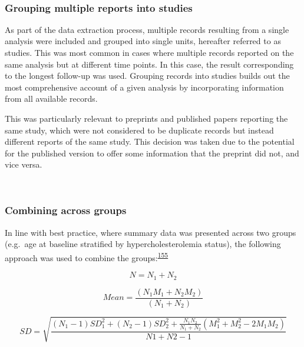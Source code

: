 \documentclass[a4paper, twoside]{templates/ociamthesis}
\begin{document}
~

\hypertarget{grouping-multiple-reports-into-studies}{%
\subsubsection{Grouping multiple reports into studies}\label{grouping-multiple-reports-into-studies}}

As part of the data extraction process, multiple records resulting from a single analysis were included and grouped into single units, hereafter referred to as studies. This was most common in cases where multiple records reported on the same analysis but at different time points. In this case, the result corresponding to the longest follow-up was used. Grouping records into studies builds out the most comprehensive account of a given analysis by incorporating information from all available records.

This was particularly relevant to preprints and published papers reporting the same study, which were not considered to be duplicate records but instead different reports of the same study. This decision was taken due to the potential for the published version to offer some information that the preprint did not, and vice versa.

~

\hypertarget{combining-across-groups}{%
\subsubsection{Combining across groups}\label{combining-across-groups}}

In line with best practice, where summary data was presented across two groups (e.g.~age at baseline stratified by hypercholesterolemia status), the following approach was used to combine the groups:\textsuperscript{\protect\hyperlink{ref-higgins2019}{155}}

\begin{equation}
N = N_1 + N_2
  \label{eq:combiningGroups1}
\end{equation}

\begin{equation}
Mean = \frac{(N_1M_1 + N_2M_2)}{(N_1 + N_2)}
  \label{eq:combiningGroups2}
\end{equation}

\begin{equation}
SD = \sqrt{\frac{(N_1-1)SD_1^2 + (N_2-1)SD_2^2 + \frac{N_1N_2}{N_1 + N_2}(M_1^2 + M_2^2 - 2M_1M_2)}{N1 + N2 -1}}
  \label{eq:combiningGroups3}
\end{equation}
~
\end{document}
